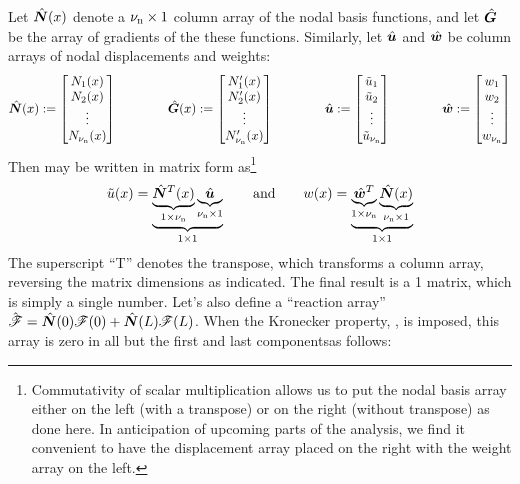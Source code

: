 \renewcommand{\gradNBFa}{\Array{G}}
Let $\hat{\bm{N}}(x)$ denote a 
${\nu_\text{n}}\times1$ column array of the nodal basis functions, and let $\gradNBFa$ be the array of gradients of the these functions. Similarly, 
let $\hat{\bm{u}}$ and $\hat{\bm{w}}$ be \numnodes{} column arrays of nodal displacements and weights:
\begin{equation}
  \NBFa(x)\definedEqual\begin{bmatrix}\NBF_1(x)\\ \NBF_2(x) \\ \vdots \\ \NBF_\numnodes(x)\end{bmatrix}
\qquad\qquad
  \gradNBFa(x)\definedEqual\begin{bmatrix}\NBF_1'(x)\\ \NBF_2'(x) \\ \vdots \\ \NBF_\numnodes'(x)\end{bmatrix}
\qquad\qquad
  \Array{u}\definedEqual\begin{bmatrix} \aprx{u}_1\\ \aprx{u}_2 \\ \vdots \\ \aprx{u}_\numnodes\end{bmatrix}
\qquad\qquad
  \Array{w}\definedEqual\begin{bmatrix}w_1\\ w_2 \\ \vdots \\ w_\numnodes\end{bmatrix}
\end{equation}
Then  may be written in matrix form as\footnote{Commutativity of scalar multiplication allows us to put the nodal basis array either on the left (with a transpose) or on the right (without transpose) as done here. In anticipation of upcoming parts of the analysis, we find it convenient to have the displacement array placed on the right with the weight array on the left.}
\begin{equation}
  \tilde{u}(x)=\underbrace{
\underbrace{\hat{\bm{N}}^T(x)}_{1\times{\nu_\text{n}}} \underbrace{\hat{\bm{u}}}_{{\nu_\text{n}}\times1}}_{1\times1}
\qquad\text{and}\qquad
  w(x)=\underbrace{\underbrace{\hat{\bm{w}}^T}_{1\times{\nu_\text{n}}}\underbrace{\hat{\bm{N}}(x)}_{{\nu_\text{n}}\times1}}_{1\times1}
\label{eq:uandwstatic}
\end{equation}
The superscript ``T'' denotes the transpose, which transforms a column array, reversing the matrix dimensions as indicated.  The final result is a 1 matrix, which is simply a single number.  Let's also define a ``reaction array'' $\hat{\bm{\mathscr{F}}}=\hat{\bm{N}}(0)\mathscr{F}(0)+\hat{\bm{N}}(L)\mathscr{F}(L)$. When the Kronecker property, , is imposed, this array is zero in all but the first and last componentsas follows:
